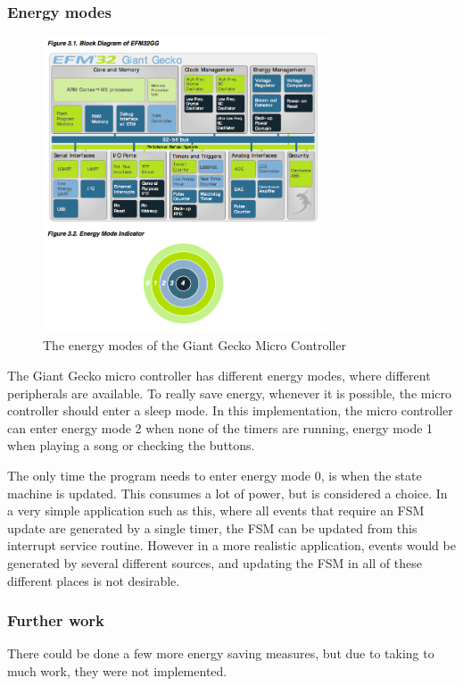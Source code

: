 \subsubsection{Energy modes}
\begin{figure}[H]
\centering
\includegraphics[width=0.75\textwidth]{figures/energymodes.png}
\caption{The energy modes of the Giant Gecko Micro Controller}
\label{fig:energymodes}
\end{figure}
The Giant Gecko micro controller has different energy modes, where different peripherals are available. 
To really save energy, whenever it is possible, the micro controller should enter a sleep mode.
In this implementation, the micro controller can enter energy mode 2 when none of the timers are running, energy mode 1 when playing a song or checking the buttons.

The only time the program needs to enter energy mode 0, is when the state machine is updated.
This consumes a lot of power, but is considered a choice. 
In a very simple application such as this, where all events that require an FSM update are generated by a single timer, the FSM can be updated from this interrupt service routine. 
However in a more realistic application, events would be generated by several different sources, and updating the FSM in all of these different places is not desirable.


\subsubsection{Further work}
There could be done a few more energy saving measures, but due to taking to much work, they were not implemented.


